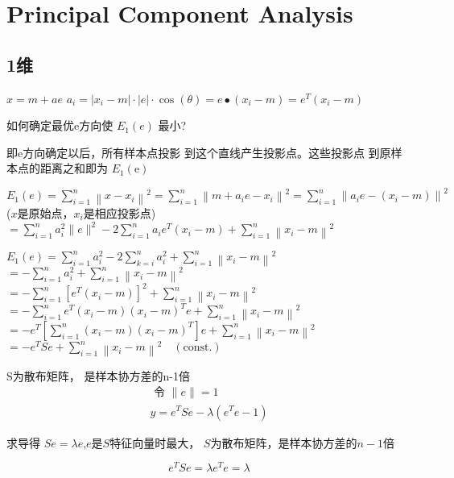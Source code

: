 \chapter{Principal Component Analysis}

\section{1维}

$ x=m+a e $
$ a_{i}=\left|x_{i}-m\right| \cdot|e| \cdot \cos (\theta)=e \bullet\left(x_{i}-m\right)=e^{T}\left(x_{i}-m\right) $

\begin{problem}
    如何确定最优e方向使 $ E_{1}(e) $ 最小?

    即e方向确定以后，所有样本点投影 到这个直线产生投影点。这些投影点 到原样本点的距离之和即为 $ E_{1}(\mathrm{e}) $
\end{problem}


$ E_{1}(e)=\sum_{i=1}^{n}\left\|x-x_{i}\right\|^{2}=\sum_{i=1}^{n}\left\|m+a_{i} e-x_{i}\right\|^{2}=\sum_{i=1}^{n}\left\|a_{i} e-\left(x_{i}-m\right)\right\|^{2} $ ($x$是原始点，$x_i$是相应投影点)
$ =\sum_{i=1}^{n} a_{i}^{2}\|e\|^{2}-2 \sum_{i=1}^{n} a_{i} e^{T}\left(x_{i}-m\right)+\sum_{i=1}^{n}\left\|x_{i}-m\right\|^{2} $

$ E_{1}(e)=\sum_{i=1}^{n} a_{i}^{2}-2 \sum_{k=i}^{n} a_{i}^{2}+\sum_{i=1}^{n}\left\|x_{i}-m\right\|^{2} $
$ =-\sum_{i=1}^{n} a_{i}^{2}+\sum_{i=1}^{n}\left\|x_{i}-m\right\|^{2} $
$ =-\sum_{i=1}^{n}\left[e^{T}\left(x_{i}-m\right)\right]^{2}+\sum_{i=1}^{n}\left\|x_{i}-m\right\|^{2} $
$ =-\sum_{i=1}^{n} e^{T}\left(x_{i}-m\right)\left(x_{i}-m\right)^{T} e+\sum_{i=1}^{n}\left\|x_{i}-m\right\|^{2} $
$ =-e^{T}\left[\sum_{i=1}^{n}\left(x_{i}-m\right)\left(x_{i}-m\right)^{T}\right] e+\sum_{i=1}^{n}\left\|x_{i}-m\right\|^{2} $
$ =-e^{T} S e+\sum_{i=1}^{n}\left\|x_{i}-m\right\|^{2} \quad (\text{const.}) $

S为散布矩阵， 是样本协方差的n-1倍
\begin{equation}
\begin{array}{l}
\text { 令 }\|e\|=1 \\
y=e^{T} S e-\lambda\left(e^{T} e-1\right)
\end{array}
\end{equation}

求导得 $ S e=\lambda e $,$e$是$S$特征向量时最大， $S$为散布矩阵，是样本协方差的$n-1$倍

\begin{equation} e^{T} S e=\lambda e^{T} e=\lambda \end{equation}

